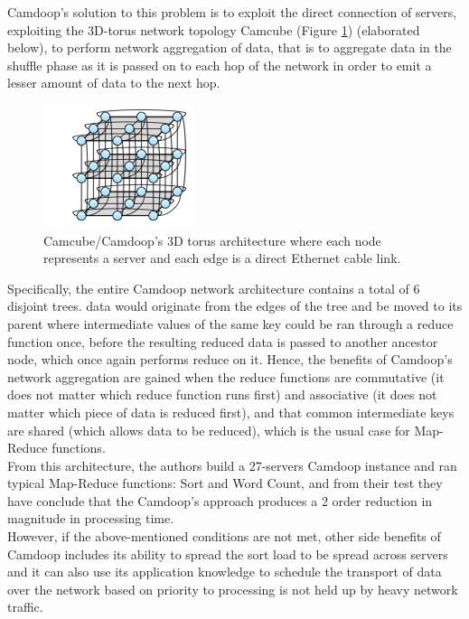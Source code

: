 \documentclass[]{article}
\begin{document}
Camdoop’s solution to this problem is to exploit the direct connection of servers, exploiting the 3D-torus network topology Camcube (Figure \ref{fig:camdoop11}) (elaborated below), to perform network aggregation of data, that is to aggregate data in the shuffle phase as it is passed on to each hop of the network in order to emit a lesser amount of data to the next hop.\\

\begin{figure}[here]
	\begin{center}
		\includegraphics{camdoop11.png}
		\caption{Camcube/Camdoop’s 3D torus architecture where each node represents a server and each edge is a direct Ethernet cable link. }
		\label{fig:camdoop11}
	\end{center}
\end{figure}

Specifically, the entire Camdoop network architecture contains a total of 6 disjoint trees. data would originate from the edges of the tree and be moved to its parent where intermediate values of the same key could be ran through a reduce function once, before the resulting reduced data is passed to another ancestor node, which once again performs reduce on it. Hence, the benefits of Camdoop’s network aggregation are gained when the reduce functions are commutative (it does not matter which reduce function runs first) and associative (it does not matter which piece of data is reduced first), and that common intermediate keys are shared (which allows data to be reduced), which is the usual case for Map-Reduce functions.\\

From this architecture, the authors build a 27-servers Camdoop instance and ran typical Map-Reduce functions: Sort and Word Count, and from their test they have conclude that the Camdoop’s approach produces a 2 order reduction in magnitude in processing time.\\

However, if the above-mentioned conditions are not met, other side benefits of Camdoop includes its ability to spread the sort load to be spread across servers and it can also use its application knowledge to schedule the transport of data over the network based on priority to processing is not held up by heavy network traffic. \\
\end{document}
